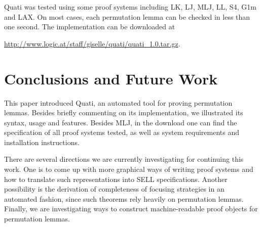\documentclass{llncs}
\begin{document}
Quati was tested using some proof systems including LK, LJ, MLJ, LL, S4, G1m and
LAX. On
most cases, each permutation lemma can be checked in less than one second. The
implementation can be downloaded at
\begin{center}
\url{http://www.logic.at/staff/giselle/quati/quati\_1.0.tar.gz}. 
\end{center}


\vspace{-2mm}

\section{Conclusions and Future Work}
\label{sec:conc}
This paper introduced Quati, an automated tool for proving permutation lemmas. Besides briefly 
commenting on its implementation, we illustrated its syntax, usage and features. Besides MLJ, in the download
one can find the specification of all proof systems tested, as well as system
requirements and installation instructions.

There are several directions we are currently investigating for continuing this work. One is to come up with 
more graphical ways of writing proof systems and how to translate such representations into SELL specifications. 
Another possibility is the derivation of completeness of focusing
strategies in an automated fashion, since such theorems rely heavily on
permutation lemmas.
Finally, we are investigating ways to construct machine-readable proof objects for permutation lemmas.

\vspace{-2mm}
\end{document}
